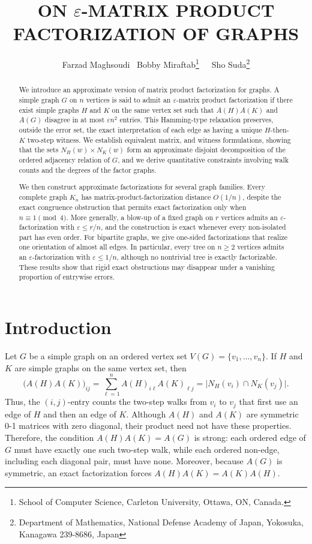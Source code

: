 \documentclass{file}
\title{\MakeUppercase{On {\Large{$\varepsilon$}}-Matrix Product Factorization of graphs}}%
\author{Farzad Maghsoudi\,\,\,\,\,Bobby Miraftab\thanks{School of Computer Science, Carleton University, Ottawa, ON, Canada.}  \,\,\,\,\, Sho Suda\thanks{Department of Mathematics, National Defense Academy of Japan, Yokosuka, Kanagawa 239-8686,
Japan}}
\date{}
\begin{document}
\maketitle

\begin{abstract}
We introduce an approximate version of matrix product factorization for graphs. A simple graph $G$ on $n$ vertices is said to admit an $\varepsilon$-matrix product factorization if there exist simple graphs $H$ and $K$ on the same vertex set such that $A(H)A(K)$ and $A(G)$ disagree in at most $\varepsilon n^{2}$ entries. This Hamming-type relaxation preserves, outside the error set, the exact interpretation of each edge as having a unique $H$-then-$K$ two-step witness. We establish equivalent matrix, and witness formulations, showing that the sets $N_H(w)\times N_K(w)$ form an approximate disjoint decomposition of the ordered adjacency relation of $G$, and we derive quantitative constraints involving walk counts and the degrees of the factor graphs.

We then construct approximate factorizations for several graph families. Every complete graph $K_n$ has matrix-product-factorization distance $O(1/n)$, despite the exact congruence obstruction that permits exact factorization only when $n\equiv 1\pmod 4$. More generally, a blow-up of a fixed graph on $r$ vertices admits an $\varepsilon$-factorization with $\varepsilon\le r/n$, and the construction is exact whenever every non-isolated part has even order. For bipartite graphs, we give one-sided factorizations that realize one orientation of almost all edges. In particular, every tree on $n\ge2$ vertices admits an $\varepsilon$-factorization with $\varepsilon\le 1/n$, although no nontrivial tree is exactly factorizable. These results show that rigid exact obstructions may disappear under a vanishing proportion of entrywise errors.
\end{abstract}
\section{Introduction}
\label{sec:introduction}

Let $G$ be a simple graph on an ordered vertex set
$V(G)=\{v_1,\dots,v_n\}$.  If $H$ and $K$ are simple graphs on the same
vertex set, then
\[
  \bigl(A(H)A(K)\bigr)_{ij}
  =
  \sum_{\ell=1}^n A(H)_{i\ell}A(K)_{\ell j}
  =
  \bigl|N_H(v_i)\cap N_K(v_j)\bigr|.
\]
Thus, the $(i,j)$-entry counts the two-step walks from $v_i$ to $v_j$ that first use an edge of $H$ and then an edge of $K$. Although $A(H)$ and $A(K)$ are symmetric 0-1 matrices with zero diagonal, their product need not have these properties. Therefore, the condition $A(H)A(K)=A(G)$ is strong: each ordered edge of $G$ must have exactly one such two-step walk, while each ordered non-edge, including each diagonal pair, must have none.
Moreover, because $A(G)$ is symmetric, an exact factorization forces $A(H)A(K)=A(K)A(H)$.
\end{document}
